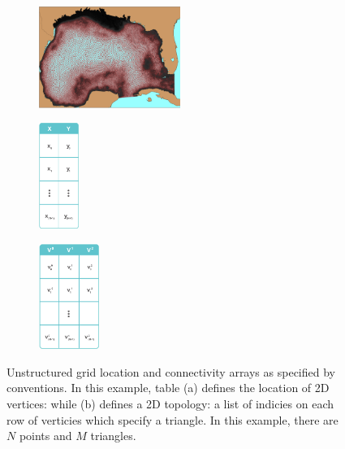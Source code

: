 \begin{figure}
  \centering
  \begin{subfigure}[t]{0.33\textwidth}
    \centering
    \includegraphics[height=1.3in]{../figs/USF_FVCOM_Hurricane_Ike_2D_final_run_with_waves_topology.png}
    \caption{}
    \label{fig:usf_fvcom_ugrid}
  \end{subfigure}
  \begin{subfigure}[t]{0.32\textwidth}
    \centering
    \includegraphics[height=1.35in]{../figs/xy_table}
    \caption{}
    \label{fig:xytable}
  \end{subfigure}
  \begin{subfigure}[t]{0.32\textwidth}
    \centering
    \includegraphics[height=1.35in]{../figs/v_table}
    \caption{}
    \label{fig:vtable}
  \end{subfigure}
  \caption{Unstructured grid location and connectivity arrays as
    specified by \cfugrid{} conventions. In this example, table (a)
    defines the location of 2D vertices: while (b) defines a 2D
    topology: a list of indicies on each row of verticies which
    specify a triangle. In this example, there are $N$ points and $M$
    triangles.}
\end{figure}
